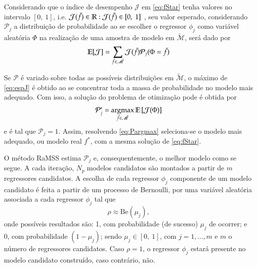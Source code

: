 Considerando que o índice de desempenho $\mathcal{J}$ em \eqref{eq:fStar} tenha valores no intervalo $[0,\ 1]$, i.e.  $ \mathcal{J}(\tilde{f}) \in \mathbb{R} : \mathcal{J}(\tilde{f}) \in [0,\ 1] $
, 
seu valor esperado,
considerando $ \mathcal{P}_j$ a distribuição de probabilidade ao se escolher o regressor $\phi_j$ como variável aleatória $\Phi$ na realização de uma amostra de modelo em  $ \tilde{\mathscr{M}}$, será dado por
\begin{equation}
   \mathbb{E}[\mathcal{J}] = \sum_{\tilde{f}\in \tilde{\mathscr{M}}} \mathcal{J}(\tilde{f})\mathcal{P}_j(\Phi=\tilde{f})
\label{eq:espJ}
\end{equation}

Se $\mathcal{P}$ é variado sobre todas as possíveis distribuições em $\tilde{\mathscr{M}}$, o máximo de \eqref{eq:espJ} é obtido ao se concentrar toda a massa de probabilidade no modelo mais adequado. Com isso, a solução do problema de otimização pode é obtida por
\begin{equation}
   \mathcal{P}^*_j = \operatorname*{argmax}_{\tilde{f}\in  \tilde{\mathscr{M}}} \mathbb{E}\left[ \mathcal{J}(\Phi)  \right]   
\label{eq:Pargmax}
\end{equation}
e é tal que $\mathcal{P}_{j}=1$. Assim, resolvendo \eqref{eq:Pargmax} seleciona-se o modelo mais adequado, ou modelo real $f^*$, com a mesma solução de \eqref{eq:fStar}.

O método RaMSS estima $\mathcal{P}_{j}$ e, consequentemente, o melhor modelo como se segue. A cada iteração, $N_p$ modelos candidatos são montados a partir de $m$ regressores candidatos. A escolha de cada regressor $\phi_j$ componente de um modelo candidato é feita a partir de um processo de Bernoulli, por uma variável aleatória associada a cada regressor  $\phi_j$ tal que
\begin{equation}
   \rho \approx \text{Be}(\mu_j),
\label{eq:bernulli}
\end{equation}
onde possíveis resultados são: 1, com probabilidade (de sucesso) $\mu_j$ de ocorrer; e 0, com probabilidade $(1-\mu_j)$; sendo $\mu_j \in [0,\ 1]$,  com $ j=1, \dots, m$ e $m$ o número de regressores candidatos. 
Caso $\rho=1$, o regressor  $\phi_j$ estará presente no modelo candidato construído, caso contrário, não. 

